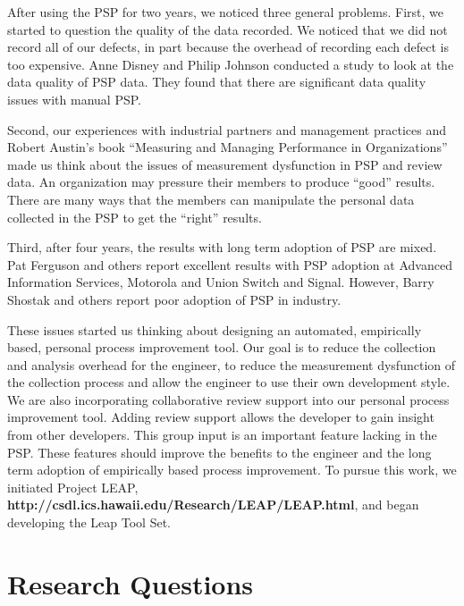 After using the PSP for two years, we noticed three general problems.
First, we started to question the quality of the data recorded.  We noticed
that we did not record all of our defects, in part because the overhead of
recording each defect is too expensive.  Anne Disney and Philip Johnson
conducted a study to look at the data quality of PSP data.  They found that
there are significant data quality issues with manual PSP.\cite{Disney98,
  Disney98a}

Second, our experiences with industrial partners and management practices
and Robert Austin's book ``Measuring and Managing Performance in
Organizations''\cite{Austin96} made us think about the issues of
measurement dysfunction in PSP and review data.  An organization may
pressure their members to produce ``good'' results.  There are many ways
that the members can manipulate the personal data collected in the PSP to
get the ``right'' results.

Third, after four years, the results with long term adoption of PSP are
mixed.  Pat Ferguson and others report excellent results with PSP adoption
at Advanced Information Services, Motorola and Union Switch and
Signal\cite{Ferguson97}.  However, Barry Shostak and others report poor
adoption of PSP in industry\cite{Shostak96,Emam96}.


These issues started us thinking about designing an automated, empirically
based, personal process improvement tool.  Our goal is to reduce the
collection and analysis overhead for the engineer, to reduce the
measurement dysfunction of the collection process and allow the engineer to
use their own development style.  We are also incorporating collaborative
review support into our personal process improvement tool.  Adding review
support allows the developer to gain insight from other developers.  This
group input is an important feature lacking in the PSP.  These features
should improve the benefits to the engineer and the long term adoption of
empirically based process improvement.  To pursue this work, we initiated
Project LEAP, {\bf http://csdl.ics.hawaii.edu/Research/LEAP/LEAP.html}, and
began developing the Leap Tool Set.

\section*{Research Questions}


